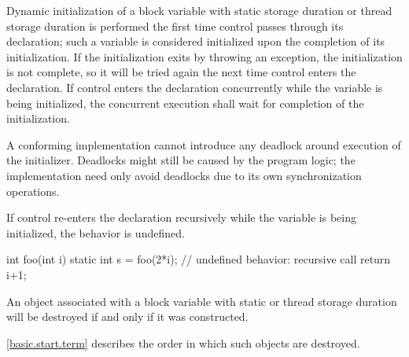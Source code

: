 \pnum
{}%
%
%
%
Dynamic initialization of a block variable with
static storage duration or
thread storage duration is performed
the first time control passes through its declaration; such a variable is
considered initialized upon the completion of its initialization. If the
initialization exits by throwing an exception, the initialization is not
complete, so it will be tried again the next time control enters the
declaration.
If control enters the declaration concurrently while the variable is
being initialized, the concurrent execution shall wait for completion
of the initialization.
\begin{note}
A conforming implementation cannot introduce
any deadlock around execution of the initializer.
Deadlocks might still be caused by the program logic;
the implementation need only avoid deadlocks
due to its own synchronization operations.
\end{note}
If control
re-enters the declaration recursively while
the variable is being initialized, the behavior is undefined.
%
%
%
%
%
\begin{example}
\begin{codeblock}
int foo(int i) {
  static int s = foo(2*i);      // undefined behavior: recursive call
  return i+1;
}
\end{codeblock}
\end{example}

\pnum
{}%
An object associated with
a block variable with static or thread storage duration
will be destroyed if and only if it was constructed.
\begin{note}
\ref{basic.start.term} describes the order in which such objects are destroyed.
\end{note}

